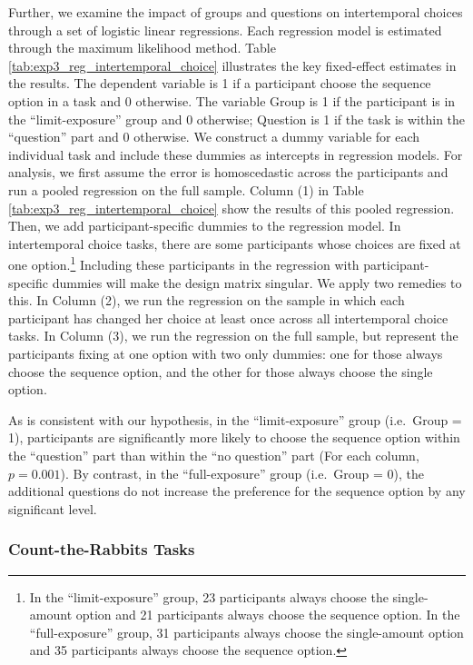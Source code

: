 \documentclass[
  12pt,
]{article}
\begin{document}


Further, we examine the impact of groups and questions on intertemporal
choices through a set of logistic linear regressions. Each regression
model is estimated through the maximum likelihood method. Table
\ref{tab:exp3_reg_intertemporal_choice} illustrates the key fixed-effect
estimates in the results. The dependent variable is 1 if a participant
choose the sequence option in a task and 0 otherwise. The variable Group
is 1 if the participant is in the ``limit-exposure'' group and 0
otherwise; Question is 1 if the task is within the ``question'' part and
0 otherwise. We construct a dummy variable for each individual task and
include these dummies as intercepts in regression models. For analysis,
we first assume the error is homoscedastic across the participants and
run a pooled regression on the full sample. Column (1) in Table
\ref{tab:exp3_reg_intertemporal_choice} show the results of this pooled
regression. Then, we add participant-specific dummies to the regression
model. In intertemporal choice tasks, there are some participants whose
choices are fixed at one option.\footnote{In the ``limit-exposure''
  group, 23 participants always choose the single-amount option and 21
  participants always choose the sequence option. In the
  ``full-exposure'' group, 31 participants always choose the
  single-amount option and 35 participants always choose the sequence
  option.} Including these participants in the regression with
participant-specific dummies will make the design matrix singular. We
apply two remedies to this. In Column (2), we run the regression on the
sample in which each participant has changed her choice at least once
across all intertemporal choice tasks. In Column (3), we run the
regression on the full sample, but represent the participants fixing at
one option with two only dummies: one for those always choose the
sequence option, and the other for those always choose the single
option.



As is consistent with our hypothesis, in the ``limit-exposure'' group
(i.e.~Group = 1), participants are significantly more likely to choose
the sequence option within the ``question'' part than within the ``no
question'' part (For each column, \(p=0.001\)). By contrast, in the
``full-exposure'' group (i.e.~Group = 0), the additional questions do
not increase the preference for the sequence option by any significant
level.

\hypertarget{count-the-rabbits-tasks}{%
\subsubsection{\texorpdfstring{Count-the-Rabbits Tasks
\label{exp3_rabbit_result}}{Count-the-Rabbits Tasks }}\label{count-the-rabbits-tasks}}
\end{document}

